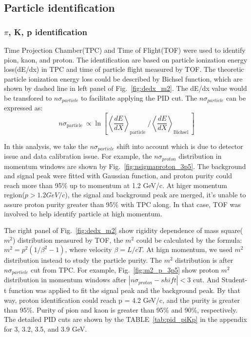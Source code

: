 \subsection{Particle identification}

\subsubsection{$\pi$, K, p identification}

Time Projection Chamber(TPC)\cite{ANDERSON2003659} and Time of Flight(TOF)\cite{LLOPE2012S110} were used to identify pion, kaon, and proton. 
The identification are based on particle ionization energy loss(dE/dx) in TPC and time of particle flight measured by TOF.
The theoretic particle ionization energy loss could be described by Bichsel function, which are shown by dashed line in left panel of Fig.~\ref{fig:dedx_m2}.
The dE/dx value would be transfored to $n\sigma_{particle}$ to facilitate applying the PID cut. The $n\sigma_{particle}$ can be expressed as:
\begin{equation}
n \sigma_{\text {particle }} \propto \ln \left[\left\langle\frac{d E}{d X}\right\rangle_{\text {particle }} /\left\langle\frac{d E}{d X}\right\rangle_{\text {Bichsel }}\right]
\label{eq:nsigma}
\end{equation}

In this analysis, we take the $n\sigma_{particle}$ shift into account which is due to detector issue and data calibration issue.
For example, the $n\sigma_{proton}$ distribution in momentum windows are shown by Fig.~\ref{fig:nsigmaproton_3p5}.
The background and signal peak were fitted with Gaussian function, and proton purity could reach more than 95\% up to momentum at 1.2 GeV/c.
At higer momentum region($p > 1.2 GeV/c$), the signal and background peak are merged, it's unable to assure proton purity greater than 95\% with TPC along.
In that case, TOF was involved to help identify particle at high momentum.

The right panel of Fig.~\ref{fig:dedx_m2} show rigidity dependence of mass square($m^2$) distribution measured by TOF, the $m^2$ could be calculated by the formula: 
$m^2 = p^2(1/\beta^2 - 1)$, where velocity $\beta = L/cT$. At hign momentum, we used $m^2$ distribution instead to study the particle purity. 
The $m^2$ distribution is after $n\sigma_{particle}$ cut from TPC. For example, Fig.~\ref{fig:m2_p_3p5} show proton $m^2$ distribution in momentum windows
after $|n\sigma_{proton} -shift| < 3$ cut. And Student-t function was applied to fit the signal peak and the background peak.
By that way, proton identification could reach p = 4.2 GeV/c, and the purity is greater than 95\%. Purity of pion and kaon is greater than 95\% and 90\%, respectively.  
The detailed PID cuts are shown by the TABLE~\ref{tab:pid_piKp} in the appendix for 3, 3.2, 3.5, and 3.9 GeV.

